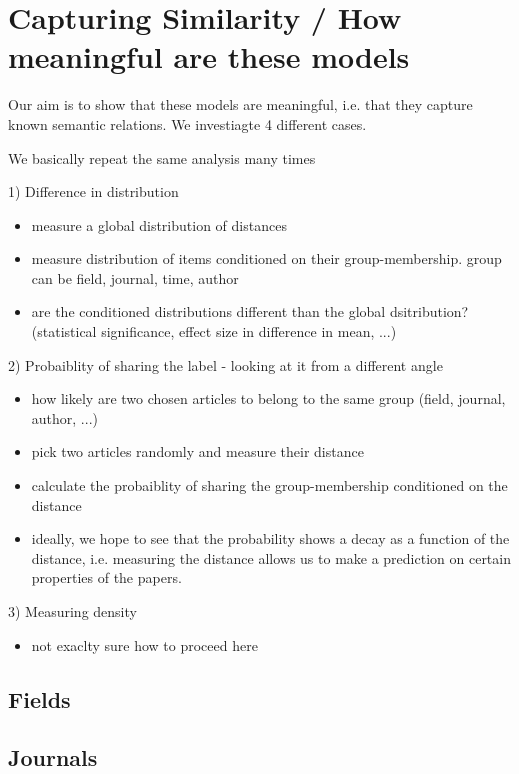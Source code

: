 \documentclass[aps,pre,twocolumn,superscriptaddress]{revtex4-1}
\begin{document}
\section{Capturing Similarity / How meaningful are these models}
%
Our aim is to show that these models are meaningful, i.e. that they capture known semantic relations.
We investiagte 4 different cases.

We basically repeat the same analysis many times

1) Difference in distribution
\begin{itemize}
 \item measure a global distribution of distances
 \item measure distribution of items conditioned on their group-membership. group can be field, journal, time, author
 \item are the conditioned distributions different than the global dsitribution? (statistical significance, effect size in difference in mean, ...)
\end{itemize}

2) Probaiblity of sharing the label - looking at it from a different angle
\begin{itemize}
 \item how likely are two chosen articles to belong to the same group (field, journal, author, ...)
 \item pick two articles randomly and measure their distance
 \item calculate the probaiblity of sharing the group-membership conditioned on the distance
 \item ideally, we hope to see that the probability shows a decay as a function of the distance, i.e. measuring the distance allows us to make a prediction on certain properties of the papers.
\end{itemize}

3) Measuring density
\begin{itemize}
 \item not exaclty sure how to proceed here
\end{itemize}

\subsection{Fields}

\subsection{Journals}
\end{document}

